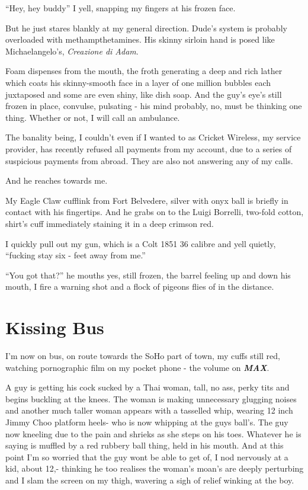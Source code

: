 \documentclass[19pt,openany]{book}
\begin{document}
``Hey, hey buddy'' I yell,
snapping my fingers at his
frozen face.

But he just stares blankly at
my general direction.
Dude's system is probably
overloaded with methampthetamines. His skinny
sirloin
hand is posed like Michaelangelo's, \textit{Creazione di Adam}.

Foam dispenses
from the mouth, the froth generating
a deep and rich lather which
coats his skinny-smooth face in a layer of
one million bubbles each juxtaposed and some are
even shiny, like dish soap. And the guy's eye's
still frozen in place, convulse, pulsating - his mind
probably, no, must be thinking one thing. Whether or not,
I will call an ambulance.

The banality being, I couldn't
even if I wanted to as Cricket Wireless, my service provider,
has recently refused all payments from my account, due to
a series of suspicious payments from abroad. They
are also not answering any of my calls.


And he reaches towards me.

My Eagle Claw cufflink from
Fort Belvedere, silver with onyx ball is briefly in contact with his fingertips.
And he grabs on to the Luigi Borrelli, two-fold cotton, shirt's cuff
immediately staining it in a deep crimson red.

I quickly pull out my gun,
which is a Colt 1851 36 calibre and yell quietly, ``fucking
stay six - feet
away from me.''

``You got that?'' he mouths yes, still frozen, the barrel
feeling up and down his mouth, I fire a warning
shot and a flock of pigeons flies of in the distance.

\chapter{Kissing Bus}
I'm now on bus, on route
towards the SoHo part of town,
my cuffs still red,
watching pornographic
film on my
pocket phone - the volume
on \textit{\textbf{MAX}}.

A guy is
getting his cock sucked
by a Thai woman,
tall, no ass, perky tits and
begins buckling at the knees.
The woman is making unnecessary
glugging noises
and another much taller woman
appears with a tasselled whip,
wearing 12 inch Jimmy Choo
platform heels- who is now
whipping at the guys ball's. The
guy now kneeling due to the pain
and shrieks as she steps on his toes.
Whatever he is saying is muffled by
a red rubbery ball thing, held
in his mouth.
And at this point I'm so worried that the
guy wont be able to get of, I nod
nervously at a kid, about
12,- thinking he
too realises the woman's moan's
are deeply perturbing and I slam
the screen on my thigh, wavering
a sigh of relief winking at the boy.
\end{document}
